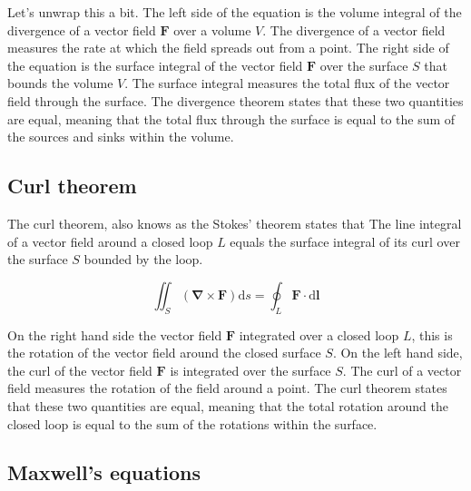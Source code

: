 Let's unwrap this a bit. The left side of the equation is the volume integral of the divergence of a vector field $\mathbf{F}$ over a volume $V$. The divergence of a vector field measures the rate at which the field spreads out from a point. The right side of the equation is the surface integral of the vector field $\mathbf{F}$ over the surface $S$ that bounds the volume $V$. The surface integral measures the total flux of the vector field through the surface. The divergence theorem states that these two quantities are equal, meaning that the total flux through the surface is equal to the sum of the sources and sinks within the volume.

\subsection{Curl theorem}\label{sec:curl-theorem}
The curl theorem, also knows as the Stokes' theorem states that The line integral of a vector field around a closed loop $L$ equals the surface integral of its curl over the surface $S$ bounded by the loop.

\begin{equation}
  \iint_S \left( \pmb{\nabla} \times \mathbf{F} \right) \text{d}s = \oint_L \mathbf{F} \cdot \text{d}\mathbf{l}
\end{equation}

On the right hand side the vector field $\mathbf{F}$ integrated over a closed loop $L$, this is the rotation of the vector field around the closed surface $S$. On the left hand side, the curl of the vector field $\mathbf{F}$ is integrated over the surface $S$. The curl of a vector field measures the rotation of the field around a point. The curl theorem states that these two quantities are equal, meaning that the total rotation around the closed loop is equal to the sum of the rotations within the surface.


\subsection{Maxwell's equations}

